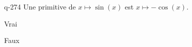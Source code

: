 \begin{truefalse}{q-274}
Une primitive de $x\mapsto \sin(x)$ est $x\mapsto -\cos(x)$.
\item* Vrai
\item Faux
\end{truefalse}

